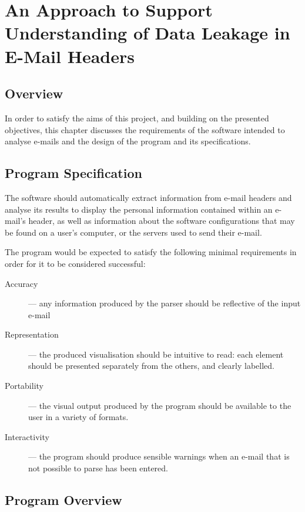 \chapter{An Approach to Support Understanding of Data Leakage in E-Mail Headers}\label{chap:des}

\section{Overview}

In order to satisfy the aims of this project, and building on the presented
objectives, this chapter discusses the requirements of the software intended to
analyse e-mails and the design of the program and its specifications.

\section{Program Specification}

The software should automatically extract information from e-mail headers and
analyse its results to display the personal information contained within an
e-mail's header, as well as information about the software configurations that
may be found on a user's computer, or the servers used to send their e-mail.

The program would be expected to satisfy the following minimal requirements in
order for it to be considered successful: 

\begin{description} 
	
\item [{Accuracy}] --- any information produced by the parser should be
	reflective of the input e-mail

\item [{Representation}] --- the produced visualisation should be intuitive to
	read: each element should be presented separately from the others, and
	clearly labelled.

\item [{Portability}] --- the visual output produced by the program should be
	available to the user in a variety of formats.

\item [{Interactivity}] --- the program should produce sensible warnings when
	an e-mail that is not possible to parse has been entered.

\end{description}

\section{Program Overview}

